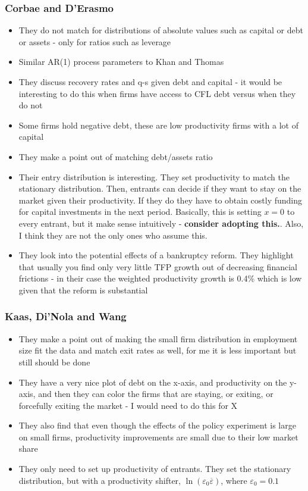 \documentclass[12pt]{article}
\begin{document}
\subsubsection*{Corbae and D'Erasmo}
\begin{itemize}\setlength\itemsep{0em} \small
    \item They do not match for distributions of absolute values such as capital or debt or assets - only for ratios such as leverage
    \item Similar AR(1) process parameters to Khan and Thomas
    \item They discuss recovery rates and q-s given debt and capital - it would be interesting to do this when firms have access to CFL debt versus when they do not
    \item Some firms hold negative debt, these are low productivity firms with a lot of capital
    \item They make a point out of matching debt/assets ratio
    \item Their entry distribution is interesting. They set productivity to match the stationary distribution. Then, entrants can decide if they want to stay on the market given their productivity. If they do they have to obtain costly funding for capital investments in the next period. Basically, this is setting $x=0$ to every entrant, but it make sense intuitively - \textbf{consider adopting this.}. Also, I think they are not the only ones who assume this.
    \item They look into the potential effects of a bankruptcy reform. They highlight that usually you find only very little TFP growth out of decreasing financial frictions - in their case the weighted productivity growth is 0.4\% which is low given that the reform is substantial
\end{itemize} \normalsize

\subsubsection*{Kaas, Di'Nola and Wang}
\begin{itemize}\setlength\itemsep{0em} \small
    \item They make a point out of making the small firm distribution in employment size fit the data and match exit rates as well, for me it is less important but still should be done
    \item They have a very nice plot of debt on the x-axis, and productivity on the y-axis, and then they can color the firms that are staying, or exiting, or forcefully exiting the market - I would need to do this for X
    \item They also find that even though the effects of the policy experiment is large on small firms, productivity improvements are small due to their low market share
    \item They only need to set up productivity of entrants. They set the stationary distribution, but with a productivity shifter, $\ln(\varepsilon_0\overline{\varepsilon})$, where $\varepsilon_0 = 0.1$
\end{itemize} \normalsize
\end{document}
